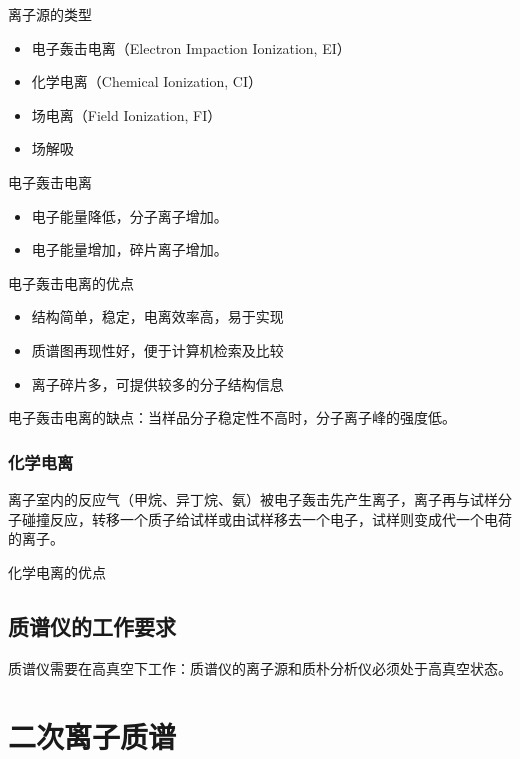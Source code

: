 离子源的类型
\begin{itemize}
    \item 电子轰击电离（Electron Impaction Ionization, EI）
    \item 化学电离（Chemical Ionization, CI）
    \item 场电离（Field Ionization, FI）
    \item 场解吸
\end{itemize}
电子轰击电离
\begin{itemize}
    \item 电子能量降低，分子离子增加。
    \item 电子能量增加，碎片离子增加。
\end{itemize}
电子轰击电离的优点
\begin{itemize}
    \item 结构简单，稳定，电离效率高，易于实现
    \item 质谱图再现性好，便于计算机检索及比较
    \item 离子碎片多，可提供较多的分子结构信息
\end{itemize}
电子轰击电离的缺点：当样品分子稳定性不高时，分子离子峰的强度低。

\subsubsection{化学电离}
离子室内的反应气（甲烷、异丁烷、氨）被电子轰击先产生离子，离子再与试样分子碰撞反应，转移一个质子给试样或由试样移去一个电子，试样则变成代一个电荷的离子。

化学电离的优点

\subsection{质谱仪的工作要求}
质谱仪需要在高真空下工作：质谱仪的离子源和质朴分析仪必须处于高真空状态。

\section{二次离子质谱}
